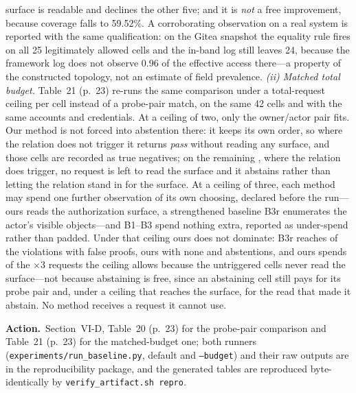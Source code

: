 \documentclass[10pt,letterpaper]{article}
\newcommand{\Action}[1]{\par\smallskip\noindent\textbf{Action.}\ #1\par}
\begin{document}
{surface is readable and declines the other five; and it is \emph{not} a free
improvement, because coverage falls to 59.52\%. A corroborating observation on a
real system is reported with the same qualification: on the Gitea snapshot the
equality rule fires on all 25 legitimately allowed cells and the in-band log
still leaves 24, because the framework log does not observe 0.96 of the effective
access there---a property of the constructed topology, not an estimate of field
prevalence.
\emph{(ii) Matched total budget.} Table~21 (p.~23) re-runs the same comparison
under a total-request ceiling per cell instead of a probe-pair match, on the same
42 cells and with the same accounts and credentials. At a ceiling of two, only
the owner/actor pair fits. Our method is not forced into abstention there: it
keeps its own order, so where the relation does not trigger it returns \emph{pass}
without reading any surface, and those \BgtOursPassCapTwo{} cells are recorded as
true negatives; on the remaining \BgtOursAbstainCapTwo{}, where the relation does
trigger, no request is left to read the surface and it abstains rather than
letting the relation stand in for the surface. At a ceiling of three, each method
may spend one further observation of its own choosing, declared before the
run---ours reads the authorization surface, a strengthened baseline B3r enumerates
the actor's visible objects---and B1--B3 spend nothing extra, reported as
under-spend rather than padded. Under that ceiling ours does not dominate: B3r
reaches \BgtBthreeRTpCapThree{} of the \BgtViolations{} violations with
\BgtBthreeRFpCapThree{} false proofs, ours \BgtOursTpCapThree{} with none and
\BgtOursAbstainCapThree{} abstentions, and ours spends
\BgtOursReqCapThree{} of the \BgtCells{}$\times$3 requests the ceiling allows
because the \BgtOursPassCapTwo{} untriggered cells never read the surface---not
because abstaining is free, since an abstaining cell still pays for its probe pair
and, under a ceiling that reaches the surface, for the read that made it abstain.
No method receives a request it cannot use.}
\Action{Section~VI-D, Table~20 (p.~23) for the probe-pair comparison and
Table~21 (p.~23) for the matched-budget one; both runners
(\texttt{experiments/run\_baseline.py}, default and \texttt{--budget}) and their
raw outputs are in the reproducibility package, and the generated tables are
reproduced byte-identically by \texttt{verify\_artifact.sh repro}.}
\end{document}
